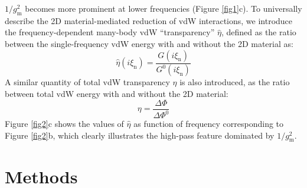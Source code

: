 \(1/g_{\mathrm{m}}^{2}\) becomes more prominent at lower frequencies
(Figure \ref{fig1}c).  To universally describe the 2D
material-mediated reduction of vdW interactions, we introduce the
frequency-dependent many-body vdW ``transparency'' \(\hat{\eta}\),
defined as the ratio between the single-frequency vdW energy with and
without the 2D material as:
\begin{equation}
\label{eq:def-eta}
\hat{\eta}(i \xi_{\mathrm{n}}) = \frac{G(i \xi_{\mathrm{n}})}{G^{0}(i \xi_{\mathrm{n}})}
\end{equation}
A similar quantity of total vdW transparency \(\eta\) is also introduced, as the ratio between total vdW energy with and without the 2D material: 
\begin{equation}
\label{eq:def-total-trans}
\eta = \frac{\Delta \Phi}{\Delta \Phi^{0}}
\end{equation}
Figure \ref{fig2}c shows the values of \(\hat{\eta}\) as function of
frequency corresponding to Figure \ref{fig2}b, which clearly illustrates the
high-pass feature dominated by \(1/g_{\mathrm{m}}^{2}\).

\section{Methods}
\label{sec:vdw-methods}




